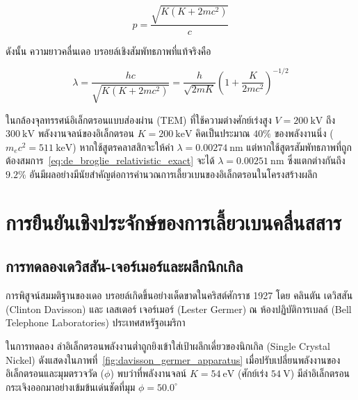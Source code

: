 \begin{equation}
p = \frac{\sqrt{K(K + 2 m c^2)}}{c}
\label{eq:relativistic_momentum_K}
\end{equation}

ดังนั้น ความยาวคลื่นเดอ บรอยล์เชิงสัมพัทธภาพที่แท้จริงคือ

\begin{equation}
\lambda = \frac{hc}{\sqrt{K(K + 2 m c^2)}} = \frac{h}{\sqrt{2mK}}\left( 1 + \frac{K}{2mc^2} \right)^{-1/2}
\label{eq:de_broglie_relativistic_exact}
\end{equation}

ในกล้องจุลทรรศน์อิเล็กตรอนแบบส่องผ่าน (TEM) ที่ใช้ความต่างศักย์เร่งสูง $V = 200~\text{kV}$ ถึง $300~\text{kV}$ พลังงานจลน์ของอิเล็กตรอน $K = 200~\text{keV}$ คิดเป็นประมาณ $40\%$ ของพลังงานนิ่ง ($m_e c^2 = 511~\text{keV}$) หากใช้สูตรคลาสสิกจะให้ค่า $\lambda = 0.00274~\text{nm}$ แต่หากใช้สูตรสัมพัทธภาพที่ถูกต้องสมการ~\eqref{eq:de_broglie_relativistic_exact} จะได้ $\lambda = 0.00251~\text{nm}$ ซึ่งแตกต่างกันถึง $9.2\%$ อันมีผลอย่างมีนัยสำคัญต่อการคำนวณการเลี้ยวเบนของอิเล็กตรอนในโครงสร้างผลึก

\section{การยืนยันเชิงประจักษ์ของการเลี้ยวเบนคลื่นสสาร}

\subsection{การทดลองเดวิสสัน-เจอร์เมอร์และผลึกนิกเกิล}

การพิสูจน์สมมติฐานของเดอ บรอยล์เกิดขึ้นอย่างเด็ดขาดในคริสต์ศักราช 1927 โดย คลินตัน เดวิสสัน (Clinton Davisson) และ เลสเตอร์ เจอร์เมอร์ (Lester Germer) ณ ห้องปฏิบัติการเบลล์ (Bell Telephone Laboratories) ประเทศสหรัฐอเมริกา

ในการทดลอง ลำอิเล็กตรอนพลังงานต่ำถูกยิงเข้าใส่เป้าผลึกเดี่ยวของนิกเกิล (Single Crystal Nickel) ดังแสดงในภาพที่~\ref{fig:davisson_germer_apparatus} เมื่อปรับเปลี่ยนพลังงานของอิเล็กตรอนและมุมตรวจวัด ($\phi$) พบว่าที่พลังงานจลน์ $K = 54~\text{eV}$ (ศักย์เร่ง $54~\text{V}$) มีลำอิเล็กตรอนกระเจิงออกมาอย่างเข้มข้นเด่นชัดที่มุม $\phi = 50.0^\circ$

